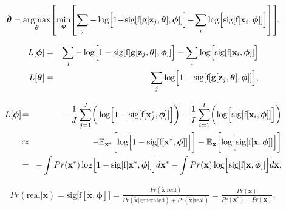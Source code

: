 \documentclass[letterpaper,twoside,openany, titlepage,oldfontcommands,titles,dvipsnames]{memoir}
\begin{document}
\begin{eqnarray}\label{eq:gan_cost_fn_sum}
 \hat{\boldsymbol\theta} = \mathop{\rm argmax}_{\boldsymbol\theta}\!\left[\min_{\boldsymbol\phi}\!\left[\sum_{j}-\log\Bigl[1\!-\!\mbox{sig}[\mbox{f}[\mbox{\bf g}[\mathbf{z}_{j},\boldsymbol\theta] ,\boldsymbol\phi]]\Bigr] \!- \!\sum_{i}\log\Bigl[\mbox{sig}[\mbox{f}[\mathbf{x}_i,\boldsymbol\phi]]\Bigr]\right]\right]\!\!.
 \end{eqnarray}

\begin{eqnarray}\label{eq:gan_cost_fun_sumtwo}
 L[\boldsymbol\phi] &=& \sum_{j} -\log\Bigl[1-\mbox{sig}[\mbox{f}[\mbox{\bf g}[\mathbf{z}_{j},\boldsymbol\theta] ,\boldsymbol\phi]]\Bigr] -\sum_{i}\log\Bigl[\mbox{sig}[\mbox{f}[\mathbf{x}_i,\boldsymbol\phi]]\Bigr]\nonumber\\
 L[\boldsymbol\theta] &=& \sum_{j} \log\Bigl[1-\mbox{sig}[\mbox{f}[\mbox{\bf g}[\mathbf{z}_{j},\boldsymbol\theta] ,\boldsymbol\phi]]\Bigr],
 \end{eqnarray}

\begin{eqnarray}\label{eq:gan_integral}
  L[\boldsymbol\phi] &\!=\!& -\frac{1}{J}\sum_{j=1}^J\biggr(\log\Bigl[1-\mbox{sig}[\mbox{f}[\mathbf{x}^{*}_j,\boldsymbol\phi]]\Bigr]\biggr) -\frac{1}{I}\sum_{i=1}^I\biggl(\log\Bigl[\mbox{sig}[\mbox{f}[\mathbf{x}_i,\boldsymbol\phi]]\Bigr]\biggr) \\
  &\!\approx\!&-\mathbb{E}_{\mathbf{x}^*}\biggl[\log\Bigl[1-\mbox{sig}[\mbox{f}[\mathbf{x}^* ,\boldsymbol\phi]]\Bigr]\biggr] -\mathbb{E}_{\mathbf{x}}\biggl[\log\Bigl[\mbox{sig}[\mbox{f}[\mathbf{x},\boldsymbol\phi]]\Bigr]\biggr]\nonumber\\
  &\!=\!&-\int Pr(\mathbf{x}^{*})\log\Bigl[1-\mbox{sig}[\mbox{f}[\mathbf{x}^* ,\boldsymbol\phi]]\Bigr]d\mathbf{x}^* - \int Pr(\mathbf{x})\log\Bigl[\mbox{sig}[\mbox{f}[\mathbf{x},\boldsymbol\phi]]\Bigr]d\mathbf{x}\nonumber,
 \end{eqnarray}

\begin{eqnarray}
 Pr(\mbox{real}|\tilde{\mathbf{x}}) = \mbox{sig}\bigl[\mbox{f}[\tilde{\mathbf{x}},\boldsymbol\phi]\bigr] = \frac{Pr(\tilde{\mathbf{x}}|\mbox{real}) }{Pr(\tilde{\mathbf{x}}|\mbox{generated})+Pr(\tilde{\mathbf{x}}|\mbox{real})} =\frac{Pr(\mathbf{x})}{Pr(\mathbf{x}^{*})+Pr(\mathbf{x})},
 \end{eqnarray}
\end{document}
